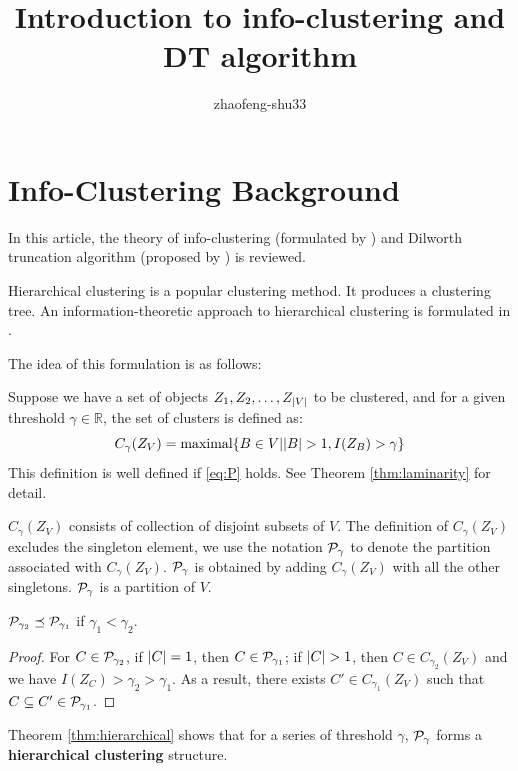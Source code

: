 \documentclass{article}
\begin{document}
\title{Introduction to info-clustering and DT algorithm}
\author{zhaofeng-shu33}
\maketitle
\tableofcontents
\section{Info-Clustering Background}
In this article, the theory of info-clustering (formulated by \cite{ic}) and Dilworth truncation algorithm (proposed by \cite{psp}) is reviewed.

Hierarchical clustering is a popular clustering method. It produces a clustering tree. 
An information-theoretic approach to hierarchical clustering is formulated in \cite{ic}.

The idea of this formulation is as follows:

Suppose we have a set of objects $Z_1, Z_2, \dots, Z_{\abs{V}}$ to be clustered, and for a given threshold $\gamma \in \mathbb{R}$, the set of clusters is defined as:
\begin{equation}\label{eq:def_CgammaZV}
C_{\gamma}(Z_V) = \textrm{maximal}\{ B \in V \vert \abs{B} > 1, I(Z_B) > \gamma \}
\end{equation}
This definition is well defined if \eqref{eq:P} holds. See Theorem \ref{thm:laminarity} for detail.

$C_{\gamma}(Z_V)$ consists of collection of disjoint subsets of $V$.
The definition of $C_{\gamma}(Z_V)$ excludes the singleton element,
we use the notation $\P_{\gamma}$ to denote the partition associated with $C_{\gamma}(Z_V)$. $\P_{\gamma}$ is obtained by adding $C_{\gamma}(Z_V)$ with all the other singletons.
$\P_{\gamma}$ is a partition of $V$.

\begin{theorem}\label{thm:hierarchical}
$\P_{\gamma_2} \preceq \P_{\gamma_1}$ if $\gamma_1 < \gamma_2$.
\end{theorem}
\begin{proof}
For $C \in \P_{\gamma_2}$, if $\abs{C}=1$, then  $C\in \P_{\gamma_1}$;
if $\abs{C}>1$, then $C \in C_{\gamma_2}(Z_V)$ and we have $I(Z_C) > \gamma_2 > \gamma_1$.
As a result, there exists $C' \in C_{\gamma_1}(Z_V)$ such that $C\subseteq C' \in \P_{\gamma_1}$.
\end{proof}
\begin{remark}
Theorem \ref{thm:hierarchical} shows that for a series of threshold $\gamma$, $\P_{\gamma}$ forms a \textbf{hierarchical clustering} structure.
\end{remark}
\end{document}
